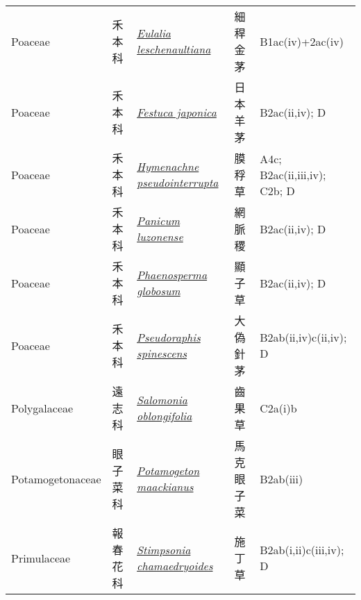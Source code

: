 {\begin{longtable}{L{2.5cm}L{2cm}L{5cm}L{2.5cm}L{3cm}}
    Poaceae & 禾本科 & \href{http://www.theplantlist.org/tpl1.1/search?q=Eulalia+leschenaultiana}{\textit{Eulalia leschenaultiana} } & 細稈金茅 & B1ac(iv)+2ac(iv)    \\
    Poaceae & 禾本科 & \href{http://www.theplantlist.org/tpl1.1/search?q=Festuca+japonica}{\textit{Festuca japonica} } & 日本羊茅 & B2ac(ii,iv); D    \\
    Poaceae & 禾本科 & \href{http://www.theplantlist.org/tpl1.1/search?q=Hymenachne+pseudointerrupta}{\textit{Hymenachne pseudointerrupta} } & 膜稃草 & A4c; B2ac(ii,iii,iv); C2b; D    \\
    Poaceae & 禾本科 & \href{http://www.theplantlist.org/tpl1.1/search?q=Panicum+luzonense}{\textit{Panicum luzonense} } & 網脈稷 & B2ac(ii,iv); D    \\
    Poaceae & 禾本科 & \href{http://www.theplantlist.org/tpl1.1/search?q=Phaenosperma+globosum}{\textit{Phaenosperma globosum} } & 顯子草 & B2ac(ii,iv); D    \\
    Poaceae & 禾本科 & \href{http://www.theplantlist.org/tpl1.1/search?q=Pseudoraphis+spinescens}{\textit{Pseudoraphis spinescens} } & 大偽針茅 & B2ab(ii,iv)c(ii,iv); D    \\
    Polygalaceae & 遠志科 & \href{http://www.theplantlist.org/tpl1.1/search?q=Salomonia+oblongifolia}{\textit{Salomonia oblongifolia} } & 齒果草 & C2a(i)b    \\
    Potamogetonaceae & 眼子菜科 & \href{http://www.theplantlist.org/tpl1.1/search?q=Potamogeton+maackianus}{\textit{Potamogeton maackianus} } & 馬克眼子菜 & B2ab(iii)    \\
    Primulaceae & 報春花科 & \href{http://www.theplantlist.org/tpl1.1/search?q=Stimpsonia+chamaedryoides}{\textit{Stimpsonia chamaedryoides} } & 施丁草 & B2ab(i,ii)c(iii,iv); D    \\

\end{longtable}}
